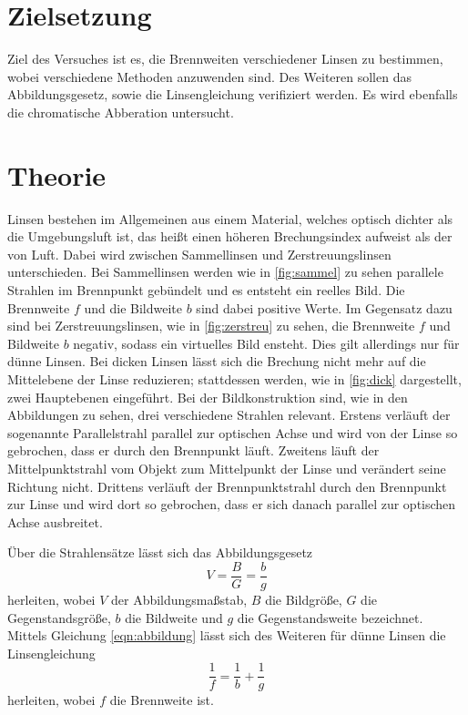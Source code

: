 \section{Zielsetzung}
    Ziel des Versuches ist es, die Brennweiten verschiedener Linsen zu bestimmen, wobei verschiedene Methoden anzuwenden sind. Des Weiteren 
    sollen das Abbildungsgesetz, sowie die Linsengleichung verifiziert werden. Es wird ebenfalls die chromatische Abberation untersucht.

\section{Theorie}
\label{sec:Theorie}
    Linsen bestehen im Allgemeinen aus einem Material, welches optisch dichter als die Umgebungsluft ist, das heißt einen höheren 
    Brechungsindex aufweist als der von Luft. Dabei wird zwischen Sammellinsen und Zerstreuungslinsen unterschieden. Bei Sammellinsen 
    werden wie in \autoref{fig:sammel} zu sehen parallele Strahlen im Brennpunkt gebündelt und es entsteht ein reelles Bild. Die 
    Brennweite $f$ und die Bildweite $b$ sind dabei positive Werte. Im Gegensatz dazu sind bei Zerstreuungslinsen, wie in
    \autoref{fig:zerstreu} zu sehen, die Brennweite $f$ und Bildweite $b$ negativ, sodass ein virtuelles Bild ensteht.
    Dies gilt allerdings nur für dünne Linsen. Bei dicken Linsen lässt sich die Brechung nicht mehr auf die Mittelebene der
    Linse reduzieren; stattdessen werden, wie in \autoref{fig:dick} dargestellt, zwei Hauptebenen eingeführt. Bei der Bildkonstruktion
    sind, wie in den Abbildungen zu sehen, drei verschiedene Strahlen relevant. Erstens verläuft der sogenannte Parallelstrahl parallel 
    zur optischen Achse und wird von der Linse so gebrochen, dass er durch den Brennpunkt läuft. Zweitens läuft der Mittelpunktstrahl
    vom Objekt zum Mittelpunkt der Linse und verändert seine Richtung nicht. Drittens verläuft der Brennpunktstrahl durch den Brennpunkt
    zur Linse und wird dort so gebrochen, dass er sich danach parallel zur optischen Achse ausbreitet.

    Über die Strahlensätze lässt sich das Abbildungsgesetz
    \begin{equation}
    \label{eqn:abbildung}
        V = \frac{B}{G} = \frac{b}{g} 
    \end{equation}
    herleiten, wobei $V$ der Abbildungsmaßstab, $B$ die Bildgröße, $G$ die Gegenstandsgröße, $b$ die Bildweite und $g$ die Gegenstandsweite 
    bezeichnet. Mittels Gleichung \eqref{eqn:abbildung} lässt sich des Weiteren für dünne Linsen die Linsengleichung
    \begin{equation}
    \label{eqn:linsen}
        \frac{1}{f} = \frac{1}{b} + \frac{1}{g}
    \end{equation}
    herleiten, wobei $f$ die Brennweite ist. 

